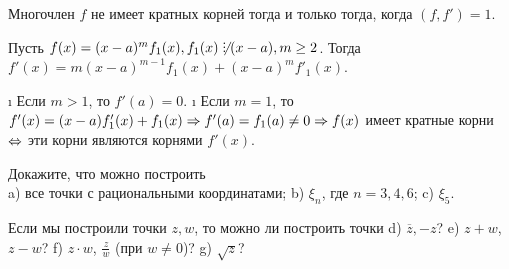 \begin{problem}[37 (9.2)]
Многочлен $f$ не имеет кратных корней тогда и только тогда, когда $(f,f')=1$.
\end{problem}

\begin{solution}
Пусть \(f(x) = (x-a)^mf_1(x), f_1(x) \not\Divby (x-a), m \ge 2\). Тогда \(f'(x)=m(x-a)^{m-1}f_1(x)+(x-a)^mf'_1(x)\).

\begin{itemize}
\tightlist
\i
  Если \(m>1\), то \(f'(a) = 0\).
\i
  Если \(m=1\), то \(f'(x)=(x-a)f'_1(x)+f_1(x) \Rightarrow f'(a)=f_1(a) \ne 0 \Rightarrow f(x)\) имеет кратные корни \(\Leftrightarrow\) эти корни являются корнями \(f'(x)\).
\end{itemize}

\end{solution}

\begin{problem}[38(9.6)]
Докажите, что можно построить\\ 
a) все точки с рациональными координатами;
b) $\xi_n$, где $n=3,4,6$;
c) $\xi_5$.

Если мы построили точки $z,w$, то можно ли построить точки 
d) $\overline{z},-z$? 
e) $z+w$, $z-w$?
f) $z\cdot w$, $\frac{z}{w}$ (при $w\neq 0$)?
g) $\sqrt{z}$?
\end{problem}

